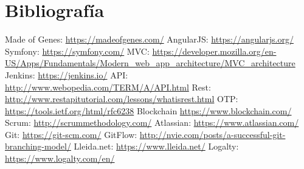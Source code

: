 \section{Bibliografía}

\renewcommand\refname{}
\begin{thebibliography}{1}

 Made of Genes: \url{https://madeofgenes.com/}
 AngularJS: \url{https://angularjs.org/}
 Symfony: \url{https://symfony.com/}
 MVC: \url{https://developer.mozilla.org/en-US/Apps/Fundamentals/Modern_web_app_architecture/MVC_architecture}
 Jenkins: \url{https://jenkins.io/}
 API: \url{http://www.webopedia.com/TERM/A/API.html}
 Rest: \url{http://www.restapitutorial.com/lessons/whatisrest.html}
 OTP: \url{https://tools.ietf.org/html/rfc6238}
 Blockchain \url{https://www.blockchain.com/}
 Scrum: \url{http://scrummethodology.com/}
 Atlassian: \url{https://www.atlassian.com/}
 Git: \url{https://git-scm.com/}
 GitFlow: \url{http://nvie.com/posts/a-successful-git-branching-model/}
 Lleida.net: \url{https://www.lleida.net/}
 Logalty: \url{https://www.logalty.com/en/}

\vspace*{0.1in}
\end{thebibliography}